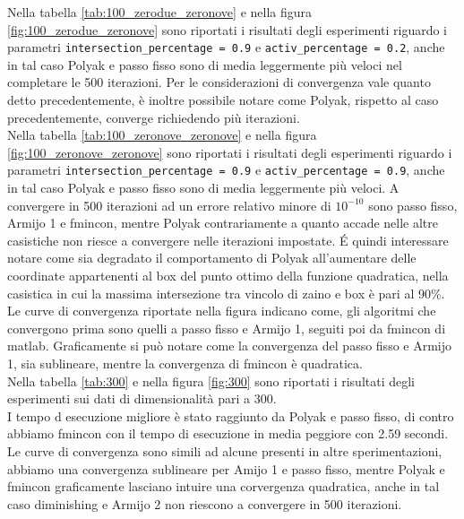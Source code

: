 \documentclass[12pt]{extarticle}
\begin{document}
Nella tabella \ref{tab:100_zerodue_zeronove} e nella figura \ref{fig:100_zerodue_zeronove} sono riportati i risultati degli esperimenti riguardo i parametri \texttt{intersection\_percentage = 0.9} e \texttt{activ\_percentage = 0.2}, anche in tal caso Polyak e passo fisso sono di media leggermente più veloci nel completare le 500 iterazioni. Per le considerazioni di convergenza vale quanto detto precedentemente, è inoltre possibile notare come Polyak, rispetto al caso precedentemente, converge richiedendo più iterazioni.\\
Nella tabella \ref{tab:100_zeronove_zeronove}  e nella figura \ref{fig:100_zeronove_zeronove}  sono riportati i risultati degli esperimenti riguardo i parametri \texttt{intersection\_percentage = 0.9} e \texttt{activ\_percentage = 0.9}, anche in tal caso Polyak e passo fisso sono di media leggermente più veloci. A convergere in 500 iterazioni ad un errore relativo minore di $10^{-10}$ sono passo fisso, Armijo 1 e fmincon, mentre Polyak contrariamente a quanto accade nelle altre casistiche non riesce a convergere nelle iterazioni impostate. \'E quindi interessare notare come sia degradato il comportamento di Polyak all'aumentare delle coordinate appartenenti al box del punto ottimo della funzione quadratica, nella casistica in cui la massima intersezione tra vincolo di zaino e box è pari al 90\%. Le curve di convergenza riportate nella figura indicano come, gli algoritmi che convergono prima sono quelli a passo fisso e Armijo 1, seguiti poi da fmincon di matlab. Graficamente si può notare come la convergenza del passo fisso e Armijo 1, sia sublineare, mentre la convergenza di fmincon è quadratica.\\
Nella tabella \ref{tab:300} e nella figura \ref{fig:300} sono riportati i risultati degli esperimenti sui dati di dimensionalità pari a 300.\\
I tempo d esecuzione migliore è stato raggiunto da Polyak e passo fisso, di contro abbiamo fmincon  con il tempo di esecuzione in media peggiore con 2.59 secondi. Le curve di convergenza sono simili ad alcune presenti in altre sperimentazioni, abbiamo una convergenza sublineare per Amijo 1 e passo fisso, mentre Polyak e fmincon graficamente lasciano intuire una corvergenza quadratica, anche in tal caso diminishing e Armijo 2 non riescono a convergere in 500 iterazioni.

\end{document}
